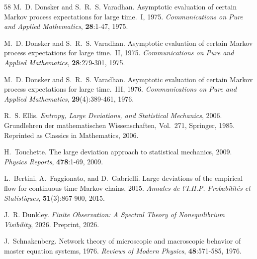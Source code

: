 \documentclass[11pt]{article}
\numberwithin{equation}{section}
\theoremstyle{thmcompact}
\theoremstyle{remark}
\begin{document}
\begin{thebibliography}{58}
{M.~D. Donsker} and {S.~R.~S. Varadhan}.
\newblock Asymptotic evaluation of certain {M}arkov process expectations for
  large time.~{I}, 1975{}.
\newblock \emph{Communications on Pure and Applied Mathematics},
  \textbf{28}:1-47, 1975.

{M.~D. Donsker} and {S.~R.~S. Varadhan}.
\newblock Asymptotic evaluation of certain {M}arkov process expectations for
  large time.~{II}, 1975{}.
\newblock \emph{Communications on Pure and Applied Mathematics},
  \textbf{28}:279-301, 1975.

{M.~D. Donsker} and {S.~R.~S. Varadhan}.
\newblock Asymptotic evaluation of certain {M}arkov process expectations for
  large time.~{III}, 1976.
\newblock \emph{Communications on Pure and Applied Mathematics},
  \textbf{29}(4):389-461, 1976.

{R.~S. Ellis}.
\newblock \emph{Entropy, Large Deviations, and Statistical Mechanics}, 2006.
\newblock Grundlehren der mathematischen Wissenschaften, Vol.~271, Springer,
  1985. Reprinted as Classics in Mathematics, 2006.

{H.~Touchette}.
\newblock The large deviation approach to statistical mechanics, 2009.
\newblock \emph{Physics Reports}, \textbf{478}:1-69, 2009.

{L.~Bertini}, {A.~Faggionato}, and {D.~Gabrielli}.
\newblock Large deviations of the empirical flow for continuous time {M}arkov
  chains, 2015.
\newblock \emph{Annales de l'I.H.P. Probabilit{\'e}s et Statistiques},
  \textbf{51}(3):867-900, 2015.

{J.~R. Dunkley}.
\newblock \emph{Finite Observation: A Spectral Theory of Nonequilibrium
  Visibility}, 2026.
\newblock Preprint, 2026.

{J.~Schnakenberg}.
\newblock Network theory of microscopic and macroscopic behavior of master
  equation systems, 1976.
\newblock \emph{Reviews of Modern Physics}, \textbf{48}:571-585, 1976.


\end{thebibliography}
\end{document}
